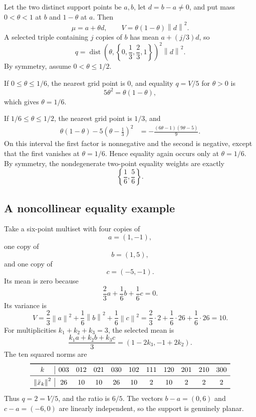 \documentclass[11pt]{article}
\theoremstyle{definition}
\theoremstyle{remark}
\newcommand{\norm}[1]{\left\lVert #1\right\rVert}
\begin{document}
Let the two distinct support points be $a,b$, let $d=b-a\ne0$, and put mass $0<\theta<1$ at $b$ and $1-\theta$ at $a$.  Then
\[
\mu=a+\theta d,
\qquad
V=\theta(1-\theta)\norm d^2.
\]
A selected triple containing $j$ copies of $b$ has mean $a+(j/3)d$, so
\begin{equation}
q=\operatorname{dist}\!\left(
\theta,\left\{0,\frac13,\frac23,1\right\}
\right)^2\norm d^2.
\label{eq:two-point-q}
\end{equation}
By symmetry, assume $0<\theta\le1/2$.

If $0\le\theta\le1/6$, the nearest grid point is $0$, and equality $q=V/5$ for $\theta>0$ is
\[
5\theta^2=\theta(1-\theta),
\]
which gives $\theta=1/6$.

If $1/6\le\theta\le1/2$, the nearest grid point is $1/3$, and
\begin{align*}
\theta(1-\theta)-5\left(\theta-\frac13\right)^2
&=-\frac{(6\theta-1)(9\theta-5)}9.
\end{align*}
On this interval the first factor is nonnegative and the second is negative, except that the first vanishes at $\theta=1/6$.  Hence equality again occurs only at $\theta=1/6$.  By symmetry, the nondegenerate two-point equality weights are exactly
\begin{equation}
\left\{\frac16,\frac56\right\}.
\label{eq:two-point-equality}
\end{equation}

\subsection{A noncollinear equality example}

Take a six-point multiset with four copies of
\[
a=(1,-1),
\]
one copy of
\[
b=(1,5),
\]
and one copy of
\[
c=(-5,-1).
\]
Its mean is zero because
\[
\frac23a+\frac16b+\frac16c=0.
\]
Its variance is
\[
V=\frac23\norm a^2+\frac16\norm b^2+\frac16\norm c^2
=\frac23\cdot2+\frac16\cdot26+\frac16\cdot26=10.
\]
For multiplicities $k_1+k_2+k_3=3$, the selected mean is
\[
\frac{k_1a+k_2b+k_3c}{3}
=(1-2k_3,-1+2k_2).
\]
The ten squared norms are
\begin{equation}
\begin{array}{c|cccccccccc}
\toprule
k&003&012&021&030&102&111&120&201&210&300\\
\midrule
\norm{\bar x_k}^2&26&10&10&26&10&2&10&2&2&2\\
\bottomrule
\end{array}
\label{eq:planar-extremizer-table}
\end{equation}
Thus $q=2=V/5$, and the ratio is $6/5$.  The vectors $b-a=(0,6)$ and $c-a=(-6,0)$ are linearly independent, so the support is genuinely planar.
\end{document}
